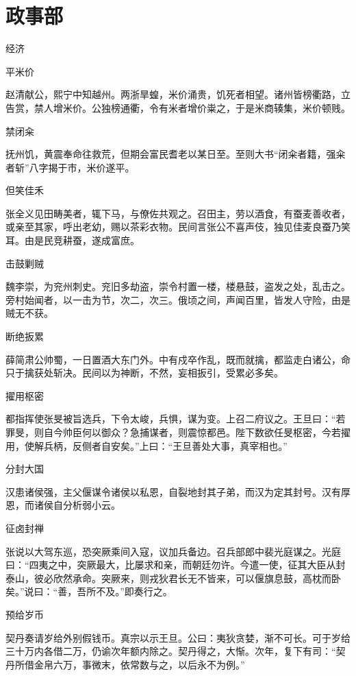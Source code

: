 \documentclass[a4paper,12pt,UTF8,twoside]{ctexbook}
\begin{document}
    
    
    \part{政事部}
    经济
    
    平米价
    
    赵清献公，熙宁中知越州。两浙旱蝗，米价涌贵，饥死者相望。诸州皆榜衢路，立告赏，禁人增米价。公独榜通衢，令有米者增价粜之，于是米商辏集，米价顿贱。
    
    禁闭籴
    
    抚州饥，黄震奉命往救荒，但期会富民耆老以某日至。至则大书“闭籴者籍，强籴者斩”八字揭于市，米价遂平。
    
    但笑佳禾
    
    张全义见田畴美者，辄下马，与僚佐共观之。召田主，劳以酒食，有蚕麦善收者，或亲至其家，呼出老幼，赐以茶彩衣物。民间言张公不喜声伎，独见佳麦良蚕乃笑耳。由是民竞耕蚕，遂成富庶。
    
    击鼓剿贼
    
    魏李崇，为兖州刺史。兖旧多劫盗，崇令村置一楼，楼悬鼓，盗发之处，乱击之。旁村始闻者，以一击为节，次二，次三。俄顷之间，声闻百里，皆发人守险，由是贼无不获。
    
    断绝扳累
    
    薛简肃公帅蜀，一日置酒大东门外。中有戍卒作乱，既而就擒，都监走白诸公，命只于擒获处斩决。民间以为神断，不然，妄相扳引，受累必多矣。
    
    擢用枢密
    
    都指挥使张旻被旨选兵，下令太峻，兵惧，谋为变。上召二府议之。王旦曰：“若罪旻，则自今帅臣何以御众？急捕谋者，则震惊都邑。陛下数欲任旻枢密，今若擢用，使解兵柄，反侧者自安矣。”上曰：“王旦善处大事，真宰相也。”
    
    分封大国
    
    汉患诸侯强，主父偃谋令诸侯以私恩，自裂地封其子弟，而汉为定其封号。汉有厚恩，而诸侯自分析弱小云。
    
    征卤封禅
    
    张说以大驾东巡，恐突厥乘间入寇，议加兵备边。召兵部郎中裴光庭谋之。光庭曰：“四夷之中，突厥最大，比屡求和亲，而朝廷勿许。今遣一使，征其大臣从封泰山，彼必欣然承命。突厥来，则戎狄君长无不皆来，可以偃旗息鼓，高枕而卧矣。”说曰：“善，吾所不及。”即奏行之。
    
    预给岁币
    
    契丹奏请岁给外别假钱币。真宗以示王旦。公曰：夷狄贪婪，渐不可长。可于岁给三十万内各借二万，仍谕次年额内除之。契丹得之，大惭。次年，复下有司：“契丹所借金帛六万，事微末，依常数与之，以后永不为例。”
    
\end{document}
